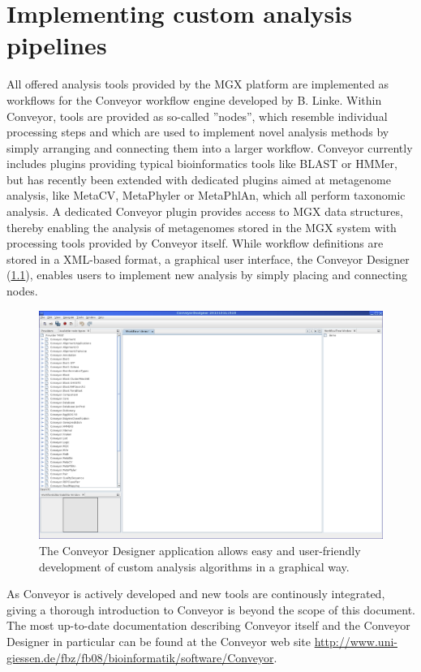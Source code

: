 
\chapter{Implementing custom analysis pipelines}
\label{custom}

All offered analysis tools provided by the MGX platform are implemented as workflows
for the Conveyor\cite{CONVEYOR} workflow engine developed by B. Linke. Within Conveyor,
tools are provided as so-called ''nodes'', which resemble individual processing steps
and which are used to implement novel analysis methods by simply arranging and connecting
them into a larger workflow. Conveyor currently includes plugins providing typical
bioinformatics tools like BLAST or HMMer, but has recently been extended with dedicated
plugins aimed at metagenome analysis, like MetaCV, MetaPhyler or MetaPhlAn, which all
perform taxonomic analysis.
A dedicated Conveyor plugin provides access to MGX data structures, thereby enabling the
analysis of metagenomes stored in the MGX system with processing tools provided by Conveyor
itself.
While workflow definitions are stored in a XML-based format, a graphical user interface,
the Conveyor Designer (\ref{designer}), enables users to implement new analysis by simply
placing and connecting nodes.

\begin{figure}[H]
\includegraphics[width=\textwidth]{img/conveyor/designer}
\caption[Conveyor Designer]{The Conveyor Designer application allows easy and user-friendly
development of custom analysis algorithms in a graphical way.}
\label{designer}
\end{figure}

As Conveyor is actively developed and new tools are continously integrated, giving a thorough
introduction to Conveyor is beyond the scope of this document. The most up-to-date documentation describing
Conveyor itself and the Conveyor Designer in particular can be found at the Conveyor web
site \url{http://www.uni-giessen.de/fbz/fb08/bioinformatik/software/Conveyor}. 

